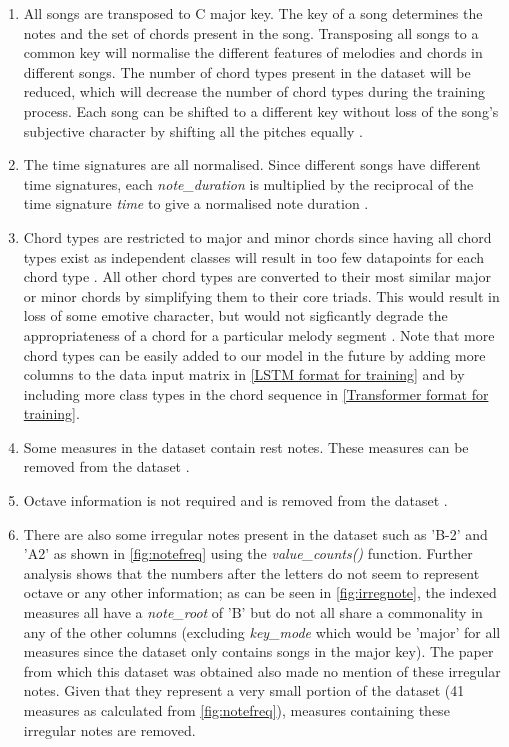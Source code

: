 \begin{enumerate}
  \item All songs are transposed to C major key. The key of a song determines the notes and the set of chords present in the song. Transposing all songs to a common key will normalise the different features of melodies and chords in different songs. The number of chord types present in the dataset will be reduced, which will decrease the number of chord types during the training process. Each song can be shifted to a different key without loss of the song's subjective character by shifting all the pitches equally \cite{MySong} \cite{MLForChords} \cite{BLSTM}.
  \item The time signatures are all normalised. Since different songs have different time signatures, each \emph{note\_duration} is multiplied by the reciprocal of the time signature \emph{time} to give a normalised note duration \cite{BLSTM}.
  \item Chord types are restricted to major and minor chords since having all chord types exist as independent classes will result in too few datapoints for each chord type \cite{BLSTM}. All other chord types are converted to their most similar major or minor chords by simplifying them to their core triads. This would result in loss of some emotive character, but would not sigficantly degrade the appropriateness of a chord for a particular melody segment \cite{MySong}. Note that more chord types can be easily added to our model in the future by adding more columns to the data input matrix in \cref{LSTM format for training} and by including more class types in the chord sequence in \cref{Transformer format for training}.
  \item Some measures in the dataset contain rest notes. These measures can be removed from the dataset \cite{MLForChords}.
  \item Octave information is not required and is removed from the dataset \cite{BLSTM}.
  \item There are also some irregular notes present in the dataset such as 'B-2' and 'A2' as shown in \cref{fig:notefreq} using the \emph{value\_counts()} function. Further analysis shows that the numbers after the letters do not seem to represent octave or any other information; as can be seen in \cref{fig:irregnote}, the indexed measures all have a \emph{note\_root} of 'B' but do not all share a commonality in any of the other columns (excluding \emph{key\_mode} which would be 'major' for all measures since the dataset only contains songs in the major key). The paper from which this dataset was obtained also made no mention of these irregular notes. Given that they represent a very small portion of the dataset (41 measures as calculated from \cref{fig:notefreq}), measures containing these irregular notes are removed.
\end{enumerate}

